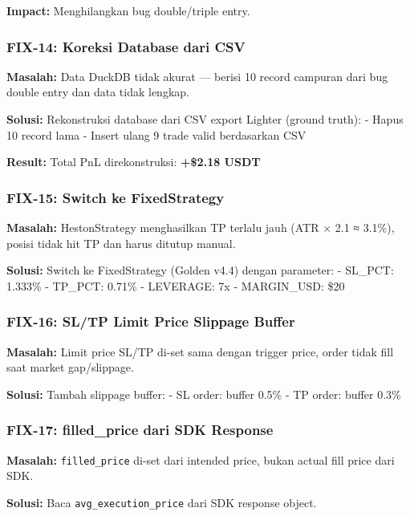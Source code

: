 \documentclass[
  11pt,
  a4paper,
]{article}
\begin{document}
\textbf{Impact:} Menghilangkan bug double/triple entry.

\subsubsection{FIX-14: Koreksi Database dari
CSV}\label{fix-14-koreksi-database-dari-csv}

\textbf{Masalah:} Data DuckDB tidak akurat --- berisi 10 record campuran
dari bug double entry dan data tidak lengkap.

\textbf{Solusi:} Rekonstruksi database dari CSV export Lighter (ground
truth): - Hapus 10 record lama - Insert ulang 9 trade valid berdasarkan
CSV

\textbf{Result:} Total PnL direkonstruksi: \textbf{+\$2.18 USDT}

\subsubsection{FIX-15: Switch ke
FixedStrategy}\label{fix-15-switch-ke-fixedstrategy}

\textbf{Masalah:} HestonStrategy menghasilkan TP terlalu jauh (ATR × 2.1
≈ 3.1\%), posisi tidak hit TP dan harus ditutup manual.

\textbf{Solusi:} Switch ke FixedStrategy (Golden v4.4) dengan parameter:
- SL\_PCT: 1.333\% - TP\_PCT: 0.71\% - LEVERAGE: 7x - MARGIN\_USD: \$20

\subsubsection{FIX-16: SL/TP Limit Price Slippage
Buffer}\label{fix-16-sltp-limit-price-slippage-buffer}

\textbf{Masalah:} Limit price SL/TP di-set sama dengan trigger price,
order tidak fill saat market gap/slippage.

\textbf{Solusi:} Tambah slippage buffer: - SL order: buffer 0.5\% - TP
order: buffer 0.3\%

\subsubsection{FIX-17: filled\_price dari SDK
Response}\label{fix-17-filled_price-dari-sdk-response}

\textbf{Masalah:} \texttt{filled\_price} di-set dari intended price,
bukan actual fill price dari SDK.

\textbf{Solusi:} Baca \texttt{avg\_execution\_price} dari SDK response
object.
\end{document}
